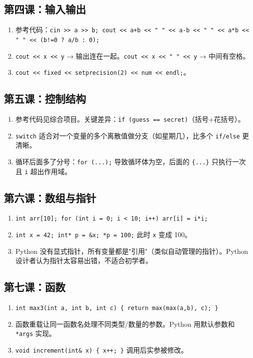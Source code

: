 \documentclass[a4paper,12pt]{ctexart}
\begin{document}
\subsection*{第四课：输入输出}
\begin{enumerate}
  \item 参考代码：\texttt{cin >> a >> b; cout << a+b << " " << a-b << " " << a*b << " " << (b!=0 ? a/b : 0);}
  \item \texttt{cout << x << y} → 输出连在一起。\texttt{cout << x << " " << y} → 中间有空格。
  \item \texttt{cout << fixed << setprecision(2) << num << endl;}。
\end{enumerate}

\subsection*{第五课：控制结构}
\begin{enumerate}
  \item 参考代码见综合项目。关键差异：\texttt{if (guess == secret)}（括号+花括号）。
  \item \texttt{switch} 适合对一个变量的多个离散值做分支（如星期几），比多个 \texttt{if/else} 更清晰。
  \item 循环后面多了分号：\texttt{for (...);} 导致循环体为空，后面的 \texttt{\{...\}} 只执行一次且 \texttt{i} 超出作用域。
\end{enumerate}

\subsection*{第六课：数组与指针}
\begin{enumerate}
  \item \texttt{int arr[10]; for (int i = 0; i < 10; i++) arr[i] = i*i;}
  \item \texttt{int x = 42; int* p = \&x; *p = 100;} 此时 \texttt{x} 变成 100。
  \item Python 没有显式指针，所有变量都是"引用"（类似自动管理的指针）。Python 设计者认为指针太容易出错，不适合初学者。
\end{enumerate}

\subsection*{第七课：函数}
\begin{enumerate}
  \item \texttt{int max3(int a, int b, int c) \{ return max(max(a,b), c); \}}
  \item 函数重载让同一函数名处理不同类型/数量的参数。Python 用默认参数和 \texttt{*args} 实现。
  \item \texttt{void increment(int\& x) \{ x++; \}} 调用后实参被修改。
\end{enumerate}
\end{document}
